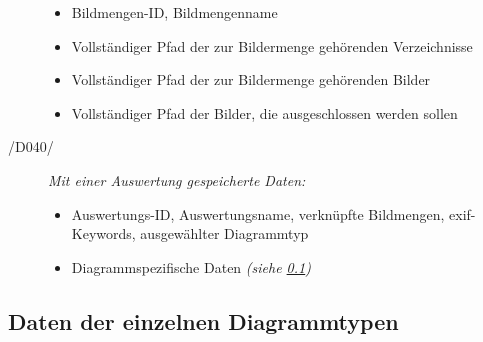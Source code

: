 \begin{description}
	\begin{itemize}
	
		\item Bildmengen-ID, Bildmengenname
		
		\item Vollständiger Pfad der zur Bildermenge gehörenden Verzeichnisse
		
		\item Vollständiger Pfad der zur Bildermenge gehörenden Bilder
		
		\item Vollständiger Pfad der Bilder, die ausgeschlossen werden sollen
	
	\end{itemize}
	
	\item[/D040/] \textit{Mit einer Auswertung gespeicherte Daten:}
	
	\begin{itemize}
		
		\item Auswertungs-ID, Auswertungsname, verknüpfte Bildmengen, \gls{exif}-Keywords, ausgewählter Diagrammtyp
		
		\item Diagrammspezifische Daten \itshape{(siehe \ref{subsec:daten-diagrammtypen})}
	
	\end{itemize}
		
\end{description}

\subsection{Daten der einzelnen Diagrammtypen}

\label{subsec:daten-diagrammtypen}

